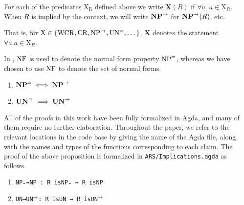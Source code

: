 
\begin{notation}
    For each of the predicates $\mathrm{X_R}$ defined above we write
    $\mathbf{X}(R)$ if $\forall a.\; a \in \mathrm{X}_R$. When $R$ is implied by the context, we will write $\mathbf{NP}^{\to}$ for $\mathbf{NP}^{\to}(R)$, etc.

    That is, for $\mathrm{X} \in \{\mathrm{WCR} , \mathrm{CR} , \mathrm{NP}^{\to} , \mathrm{UN}^{=}, \dots \}$, $\mathbf{X}$ denotes the statement $\forall a. a \in \mathrm{X}_R$.
\end{notation}


In \terese, $\mathrm{NF}$ is used to denote the normal form property $\mathrm{NP}^{=}$, whereas we have chosen to use $\mathrm{NF}$ to denote the set of normal forms.

\begin{proposition}\hfill
    \begin{enumerate}
        \item $\mathbf{NP}^{=} \iff \mathbf{NP}^{\to}$
        \item $\mathbf{UN}^{=} \, \implies \mathbf{UN}^{\to}$
    \end{enumerate}
\end{proposition}
  All of the proofs in this work have been fully formalized in Agda, and many of them require no further elaboration.  Throughout the paper, we refer to the relevant locations in the code base by giving the name of the Agda file, along with the names and types of the functions corresponding to each claim.
\newpage
The proof of the above proposition is formalized in \texttt{ARS/Implications.agda} as follows.
    \begin{enumerate}
        \item \verb|NP₌↔NP : R isNP₌ ↔ R isNP|
        \item \verb|UN→|\texttt{UN}$^{\to}$\verb|: R isUN → R is|\texttt{UN}$^{\to}$ \qedhere
    \end{enumerate}

